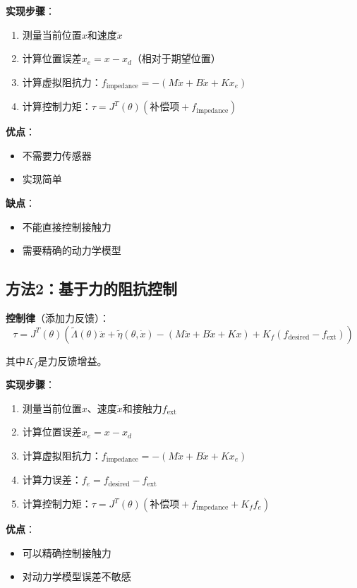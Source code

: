 \documentclass[12pt,a4paper]{article}
\begin{document}
\textbf{实现步骤}：
\begin{enumerate}
\item 测量当前位置$x$和速度$\dot{x}$
\item 计算位置误差$x_e = x - x_d$（相对于期望位置）
\item 计算虚拟阻抗力：$f_{\text{impedance}} = -(M\ddot{x} + B\dot{x} + Kx_e)$
\item 计算控制力矩：$\tau = J^T(\theta)(\text{补偿项} + f_{\text{impedance}})$
\end{enumerate}

\textbf{优点}：
\begin{itemize}
\item 不需要力传感器
\item 实现简单
\end{itemize}

\textbf{缺点}：
\begin{itemize}
\item 不能直接控制接触力
\item 需要精确的动力学模型
\end{itemize}

\subsection{方法2：基于力的阻抗控制}

\textbf{控制律}（添加力反馈）：
\begin{equation}
\tau = J^T(\theta)\left(\tilde{\Lambda}(\theta)\ddot{x} + \tilde{\eta}(\theta, \dot{x}) - (M\ddot{x} + B\dot{x} + Kx) + K_f(f_{\text{desired}} - f_{\text{ext}})\right)
\end{equation}

其中$K_f$是力反馈增益。

\textbf{实现步骤}：
\begin{enumerate}
\item 测量当前位置$x$、速度$\dot{x}$和接触力$f_{\text{ext}}$
\item 计算位置误差$x_e = x - x_d$
\item 计算虚拟阻抗力：$f_{\text{impedance}} = -(M\ddot{x} + B\dot{x} + Kx_e)$
\item 计算力误差：$f_e = f_{\text{desired}} - f_{\text{ext}}$
\item 计算控制力矩：$\tau = J^T(\theta)(\text{补偿项} + f_{\text{impedance}} + K_f f_e)$
\end{enumerate}

\textbf{优点}：
\begin{itemize}
\item 可以精确控制接触力
\item 对动力学模型误差不敏感
\end{itemize}
\end{document}
